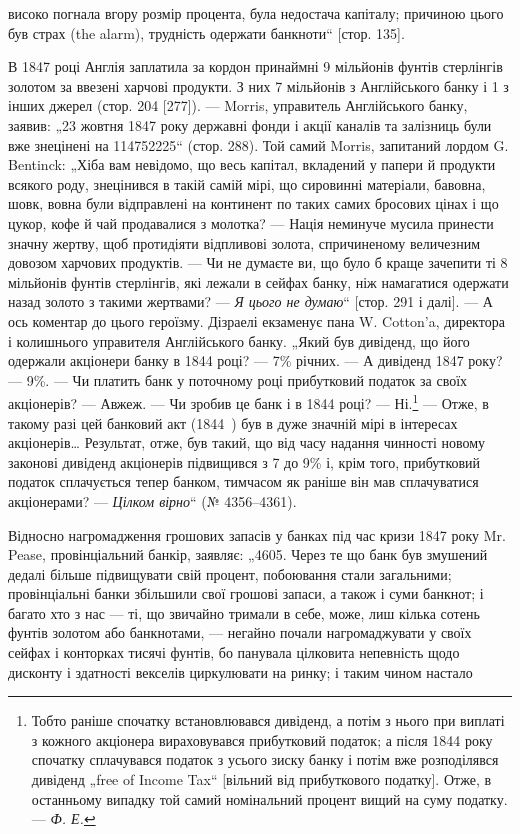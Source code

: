 \parcont{}  %
високо погнала вгору розмір процента, була недостача капіталу;
причиною цього був страх (the alarm), трудність одержати банкноти“ [стор. 135].

В 1847 році Англія заплатила за кордон принаймні 9 мільйонів фунтів стерлінгів золотом за ввезені
харчові продукти.
З них 7 мільйонів з Англійського банку і 1 з інших джерел
(стор. 204 [277]). — Morris, управитель Англійського банку, заявив:
„23 жовтня 1847 року державні фонди і акції каналів та залізниць
були вже знецінені на \num{114752225}“ (стор. 288).
Той самий Morris, запитаний лордом G. Bentinck: „Хіба вам невідомо, що весь капітал, вкладений у
папери й продукти всякого роду, знецінився в такій самій мірі, що сировинні матеріали,
бавовна, шовк, вовна були відправлені на континент по таких самих
бросових цінах і що цукор, кофе й чай продавалися з молотка? —
Нація неминуче мусила принести значну жертву, щоб протидіяти
відпливові золота, спричиненому величезним довозом харчових
продуктів. — Чи не думаєте ви, що було б краще зачепити ті
8 мільйонів фунтів стерлінгів, які лежали в сейфах банку, ніж
намагатися одержати назад золото з такими жертвами? — \emph{Я цього
не думаю}“ [стор. 291 і далі]. — А ось коментар до цього героїзму. Дізраелі екзаменує пана W.
Cotton’a, директора і колишнього
управителя Англійського банку. „Який був дивіденд, що його
одержали акціонери банку в 1844 році? — 7\% річних. — А дивіденд 1847 року? — 9\%. — Чи платить банк у
поточному році прибутковий податок за своїх акціонерів? — Авжеж. — Чи зробив
це банк і в 1844 році? — Ні.\footnote{
Тобто раніше спочатку встановлювався дивіденд, а потім з нього при
виплаті з кожного акціонера вираховувався прибутковий податок; а після
1844 року спочатку сплачувався податок з усього зиску банку і потім вже
розподілявся дивіденд „free of Income Tax“ [вільний від прибуткового податку].
Отже, в останньому випадку той самий номінальний процент вищий на суму
податку. — \emph{Ф. Е.}
} — Отже, в такому разі цей банковий
акт (1844~) був в дуже значній мірі в інтересах акціонерів\dots{}
Результат, отже, був такий, що від часу надання чинності новому законові дивіденд акціонерів
підвищився з 7 до 9\% і,
крім того, прибутковий податок сплачується тепер банком, тимчасом як раніше він мав сплачуватися
акціонерами? — \emph{Цілком
вірно}“ (№ 4356--4361).

Відносно нагромадження грошових запасів у банках під час
кризи 1847 року Mr. Pease, провінціальний банкір, заявляє: „4605.
Через те що банк був змушений дедалі більше підвищувати
свій процент, побоювання стали загальними; провінціальні банки
збільшили свої грошові запаси, а також і суми банкнот; і багато хто з нас — ті, що звичайно тримали
в себе, може, лиш
кілька сотень фунтів золотом або банкнотами, — негайно почали нагромаджувати у своїх сейфах і
конторках тисячі фунтів, бо панувала цілковита непевність щодо дисконту і здатності векселів
циркулювати на ринку; і таким чином настало
\parbreak{}  %
